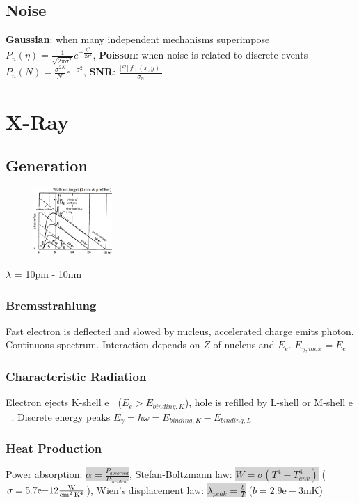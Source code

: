 \documentclass[9pt]{article}
\newcommand{\grey}[1]{\setlength{\fboxsep}{0pt}\colorbox{lightgrey}{#1}}
\begin{document}
\begin{multicols}{2}
\subsection{Noise}
\textbf{Gaussian}: when many independent mechanisms superimpose $P_n(\eta)=\frac{1}{\sqrt{2\pi \sigma^2}}e^{-\frac{\eta ^2}{2\sigma ^2}}$, \textbf{Poisson}: when noise is related to discrete events $P_n(N)=\frac{\sigma ^{2N}}{N!}e^{-\sigma ^2}$, \textbf{SNR}: $\frac{|S[f](x,y)|}{\sigma_n}$
\section{X-Ray}
\subsection{Generation}
\begin{figure}
	\includegraphics[width=3cm]{xrayspec.png}
\end{figure}
\vspace{-5mm}
$\lambda$ = 10pm - 10nm
\subsubsection{Bremsstrahlung}
Fast electron is deflected and slowed by nucleus, accelerated charge emits photon. Continuous spectrum. Interaction depends on $Z$ of nucleus and $E_e$. $E_{\gamma,max} = E_e$
\subsubsection{Characteristic Radiation}
Electron ejects K-shell e${}^-$ ($E_e > E_{binding,K}$), hole is refilled by L-shell or M-shell e${}^-$. Discrete energy peaks $E_\gamma = \hbar \omega = E_{binding,K}-E_{binding,L}$

\subsubsection{Heat Production}
Power absorption: \grey{$\alpha = \frac{P_{absorbed}}{P_{incident}}$}, Stefan-Boltzmann law: \grey{$W = \sigma(T^4 - T^4_{env})$} ($\sigma = 5.7\mathrm{e-}12 \mathrm{W\over cm^2\,K^4}$), Wien's displacement law: \grey{$\lambda_{peak} = \frac{b}{T}$} ($b=2.9\mathrm{e-}3$mK)


\end{multicols}
\end{document}
